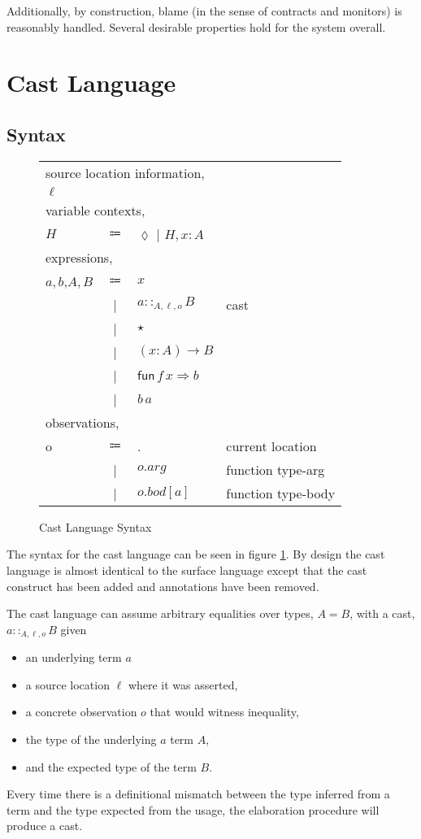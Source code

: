 Additionally, by construction, blame (in the sense of contracts and
monitors) is reasonably handled. Several desirable properties hold
for the system overall.

\section{Cast Language}

\subsection{Syntax}

\begin{figure}
\begin{tabular}{lcll}
\multicolumn{4}{l}{source location information,}\tabularnewline
$\ensuremath{\ell}$ &  &  & \tabularnewline
\multicolumn{4}{l}{variable contexts,}\tabularnewline
$H$ & $\Coloneqq$ & $\lozenge$ | $H,x:A$ & \tabularnewline
\multicolumn{4}{l}{expressions,}\tabularnewline
$a,b$,$A,B$ & $\Coloneqq$ & $x$ & \tabularnewline
 & | & $a::_{A,\ensuremath{\ell},o}B$ & cast\tabularnewline
 & | & $\star$ & \tabularnewline
 & | & $\left(x:A\right)\rightarrow B$ & \tabularnewline
 & | & $\mathsf{fun}\,f\,x\Rightarrow b$ & \tabularnewline
 & | & $b\,a$ & \tabularnewline
\multicolumn{4}{l}{observations,}\tabularnewline
o & $\Coloneqq$ & . & current location\tabularnewline
 & | & $o.arg$ & function type-arg\tabularnewline
 & | & $o.bod[a]$ & function type-body\tabularnewline
\end{tabular}



\caption{Cast Language Syntax}
\label{fig:cast-pre-syntax}
\end{figure}

The syntax for the cast language can be seen in figure \ref{fig:cast-pre-syntax}.
By design the cast language is almost identical to the surface language
except that the cast construct has been added and annotations have
been removed.

The cast language can assume arbitrary equalities over types, $A=B$,
with a cast, $a::_{A,\ensuremath{\ell},o}B$ given
\begin{itemize}
\item an underlying term $a$
\item a source location $\ell$ where it was asserted, 
\item a concrete observation $o$ that would witness inequality, 
\item the type of the underlying $a$ term $A$, 
\item and the expected type of the term $B$. 
\end{itemize}
Every time there is a definitional mismatch between the type inferred
from a term and the type expected from the usage, the elaboration
procedure will produce a cast.

